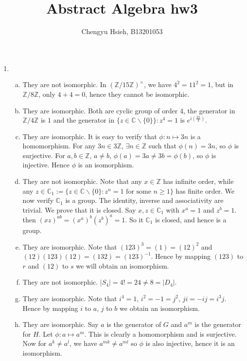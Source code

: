 \documentclass[A4paper,12pt]{article}
\title{Abstract Algebra hw3}
\author{Chengyu Hsieh, B13201053}
\date{}
\theoremstyle{definition}
\numberwithin{equation}{section}
\begin{document}
\maketitle
\begin{enumerate}[1)]
    \item
        \begin{enumerate}[(a)]
            \item
                They are not isomorphic. In $(\mathbb{Z}/15\mathbb{Z})^\times$, we have $4^2 = 11^2 = 1$, but in $\mathbb{Z}/8\mathbb{Z}$, only $4+4 = 0$, hence they cannot be isomorphic.
            \item
                They are isomorphic. Both are cyclic group of order $4$, the generator in $\mathbb{Z}/4\mathbb{Z}$ is $1$ and the generator in $\{z\in \mathbb{C}\backslash \{0\}\} : z^4 = 1$ is $e^{i(\frac{2\pi}{4})}$.
            \item
                They are isomorphic. It is easy to verify that $\phi : n\mapsto 3n$ is a homomorphism. For any $3n \in 3\mathbb{Z}$, $\exists n \in \mathbb{Z}$ such that $\phi(n) = 3n$, so $\phi$ is surjective. For $a, b \in \mathbb{Z}$, $a\neq b$, $\phi(a) = 3a \neq 3b = \phi(b)$, so $\phi$ is injective. Hence $\phi$ is an isomorphism.
            \item
                They are not isomorphic. Note that any $x \in \mathbb{Z}$ has infinite order, while any $z \in \mathbb{C}_1 := \{z \in \mathbb{C}\backslash\{0\} : z^n = 1 \text{ for some } n \ge 1 \}$ has finite order. We now verify $\mathbb{C}_1$ is a group. The identity, inverse and associativity are trivial. We prove that it is closed.
                Say $x,  z \in \mathbb{C}_1$ with $x^a = 1$ and $z^b = 1$.
                then $(xz)^{ab} = (x^a)^b(z^b)^a = 1$. So it $\mathbb{C}_1$ is closed, and hence is a group. 
            \item
                They are isomorphic. Note that $(123)^3 = (1) = (12)^2$ and $(12)(123)(12) = (132) = (123)^{-1}$. Hence by mapping $(123)$ to $r$ and $(12)$ to $s$ we will obtain an isomorphism.
            \item
                They are not isomorphic. $|S_4| = 4! = 24 \neq 8 = |D_4|$.
            \item
                They are isomorphic. Note that $i^4 = 1$, $i^2 = -1 = j^2$, $ji = -ij = i^3j$. Hence by mapping $i$ to $a$, $j$ to $b$ we obtain an isomorphism.
            \item
                They are isomorphic. 
                Say $a$ is the generator of $G$ and $a^m$ is the generator for $H$. Let $\phi: a \mapsto a^m$. This is clearly a homomorphism and is surjective. Now for $a^k \neq a^l$, we have $a^{mk} \neq a^{ml}$ so $\phi$ is also injective, hence it is an isomorphism.
        \end{enumerate}


\end{enumerate}
\end{document}
